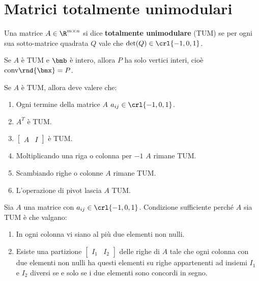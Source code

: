 \documentclass[\main/main.tex]{subfiles}
\begin{document}
\section{Matrici totalmente unimodulari}


\begin{definition}
  Una matrice $A \in \R^{m \times n}$ si dice \textbf{totalmente unimodulare} (TUM) se per ogni sua sotto-matrice quadrata $Q$ vale che $\det(Q) \in \crl{-1, 0, 1}$.
\end{definition}

\begin{theorem}
  Se $A$ è TUM e $\bmb$ è intero, allora $P$ ha solo vertici interi, cioè $\text{conv}\rnd{\bmx} = P$.
\end{theorem}

\begin{theorem}
  Se $A$ è TUM, allora deve valere che:
  \begin{enumerate}
    \item Ogni termine della matrice $A$ $a_{ij} \in \crl{-1,0,1}$.
    \item $A^T$ è TUM.
    \item $\begin{bmatrix}
              A & I
            \end{bmatrix}$ è TUM.
    \item Moltiplicando una riga o colonna per $-1$ $A$ rimane TUM.
    \item Scambiando righe o colonne $A$ rimane TUM.
    \item L'operazione di pivot lascia $A$ TUM.
  \end{enumerate}
\end{theorem}

\begin{theorem}
  Sia $A$ una matrice con $a_{ij} \in \crl{-1,0,1}$. Condizione sufficiente perché $A$ sia TUM è che valgano:
  \begin{enumerate}
    \item In ogni colonna vi siano al più due elementi non nulli.
    \item Esiste una partizione $\begin{bmatrix}
              I_1 & I_2
            \end{bmatrix}$ delle righe di $A$ tale che ogni colonna con due elementi non nulli ha questi elementi su righe appartenenti ad insiemi $I_1$ e $I_2$ diversi se e solo se i due elementi sono concordi in segno.
  \end{enumerate}
\end{theorem}
\end{document}

